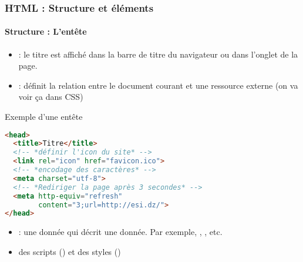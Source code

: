 \documentclass[xcolor=table]{beamer}
\begin{document}
\begin{frame}[fragile]
\frametitle{HTML : Structure et éléments}
\framesubtitle{Structure : L'entête}

\begin{minipage}{0.44\textwidth} 
\begin{itemize}
	\item {} : le titre est affiché dans la barre de titre du navigateur ou dans l'onglet de la page.
	\item {} : définit la relation entre le document courant et une ressource externe (on va voir ça dans CSS)
	
\end{itemize}
\end{minipage}
%
\begin{minipage}{0.55\textwidth}
\begin{exampleblock}{Exemple d'une entête}
\lstset{escapeinside=**}
\scriptsize\bfseries
\begin{lstlisting}[language={html}]
<head>
  <title>Titre</title>
  <!-- *définir l'icon du site* -->
  <link rel="icon" href="favicon.ico">
  <!-- *encodage des caractères* -->
  <meta charset="utf-8">
  <!-- *Rediriger la page après 3 secondes* -->
  <meta http-equiv="refresh" 
        content="3;url=http://esi.dz/">
</head>
\end{lstlisting}
\end{exampleblock}
\end{minipage}

\begin{itemize}
	\item {} : une donnée qui décrit une donnée. 
	Par exemple, , , etc.
	\item des scripts () et des styles ()
\end{itemize}

\end{frame}

%
%
\end{document}
